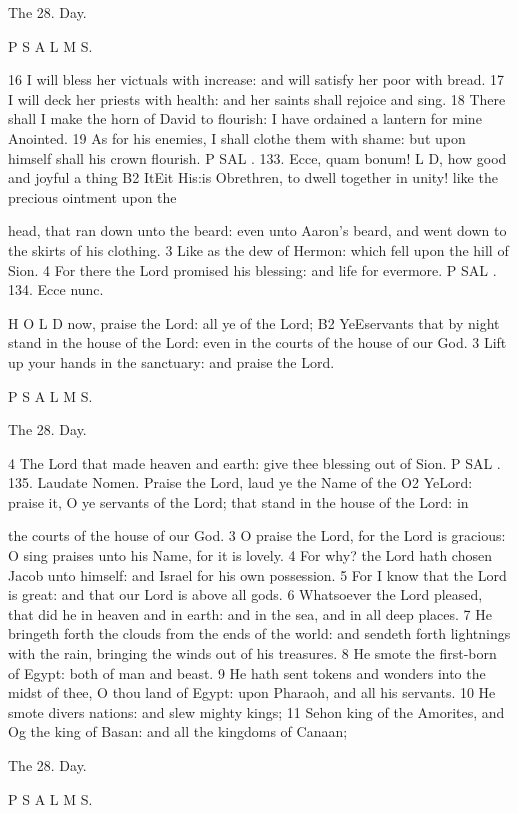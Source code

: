 The 28. Day.

P S A L M S.

16 I will bless her victuals with increase: and will satisfy her poor with bread. 17 I will deck her priests with health: and her saints shall rejoice and sing. 18 There shall I make the horn of David to flourish: I have ordained a lantern for mine Anointed. 19 As for his enemies, I shall clothe them with shame: but upon himself shall his crown flourish. P SAL . 133. Ecce, quam bonum! L D, how good and joyful a thing B2 ItEit His:is Obrethren, to dwell together in unity! like the precious ointment upon the

head, that ran down unto the beard: even unto Aaron’s beard, and went down to the skirts of his clothing. 3 Like as the dew of Hermon: which fell upon the hill of Sion. 4 For there the Lord promised his blessing: and life for evermore. P SAL . 134. Ecce nunc.

H O L D now, praise the Lord: all ye of the Lord; B2 YeEservants that by night stand in the house of the Lord: even in the courts of the house of our God. 3 Lift up your hands in the sanctuary: and praise the Lord.

P S A L M S.

The 28. Day.

4 The Lord that made heaven and earth: give thee blessing out of Sion. P SAL . 135. Laudate Nomen. Praise the Lord, laud ye the Name of the O2 YeLord: praise it, O ye servants of the Lord; that stand in the house of the Lord: in

the courts of the house of our God. 3 O praise the Lord, for the Lord is gracious: O sing praises unto his Name, for it is lovely. 4 For why? the Lord hath chosen Jacob unto himself: and Israel for his own possession. 5 For I know that the Lord is great: and that our Lord is above all gods. 6 Whatsoever the Lord pleased, that did he in heaven and in earth: and in the sea, and in all deep places. 7 He bringeth forth the clouds from the ends of the world: and sendeth forth lightnings with the rain, bringing the winds out of his treasures. 8 He smote the first-born of Egypt: both of man and beast. 9 He hath sent tokens and wonders into the midst of thee, O thou land of Egypt: upon Pharaoh, and all his servants. 10 He smote divers nations: and slew mighty kings; 11 Sehon king of the Amorites, and Og the king of Basan: and all the kingdoms of Canaan;

The 28. Day.

P S A L M S.

